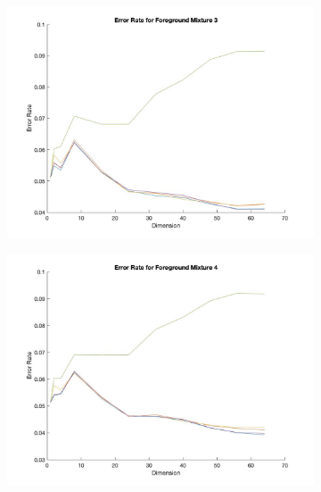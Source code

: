 \documentclass[10pt]{article}
\begin{document}
\begin{figure}[H]
\begin{subfigure}{0.5\textwidth}
		\caption{}
	\end{subfigure}
	\begin{subfigure}{0.5\textwidth}
		\centering 
		\includegraphics[scale=0.20]{part1_mix3.jpg}
		\caption{}
	\end{subfigure}
	\begin{subfigure}{0.5\textwidth}
		\centering 
		\includegraphics[scale=0.20]{part1_mix4.jpg}
		\caption{}
	\end{subfigure}
	\begin{subfigure}{0.5\textwidth}
		\centering 

\end{subfigure}
\end{figure}
\end{document}
